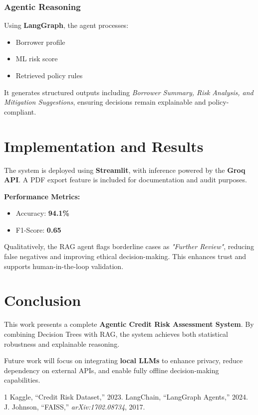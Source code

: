 \documentclass[conference]{IEEEtran}
\begin{document}
\subsubsection{Agentic Reasoning}
Using \textbf{LangGraph}, the agent processes:
\begin{itemize}
\item Borrower profile
\item ML risk score
\item Retrieved policy rules
\end{itemize}

It generates structured outputs including \textit{Borrower Summary, Risk Analysis, and Mitigation Suggestions}, ensuring decisions remain explainable and policy-compliant.

\section{Implementation and Results}
The system is deployed using \textbf{Streamlit}, with inference powered by the \textbf{Groq API}. A PDF export feature is included for documentation and audit purposes.

\textbf{Performance Metrics:}
\begin{itemize}
\item Accuracy: \textbf{94.1\%}
\item F1-Score: \textbf{0.65}
\end{itemize}

Qualitatively, the RAG agent flags borderline cases as \textit{"Further Review"}, reducing false negatives and improving ethical decision-making. This enhances trust and supports human-in-the-loop validation.

\section{Conclusion}
This work presents a complete \textbf{Agentic Credit Risk Assessment System}. By combining Decision Trees with RAG, the system achieves both statistical robustness and explainable reasoning.

Future work will focus on integrating \textbf{local LLMs} to enhance privacy, reduce dependency on external APIs, and enable fully offline decision-making capabilities.

\balance


\begin{thebibliography}{1}
\footnotesize
\bibitem{} Kaggle, ``Credit Risk Dataset,'' 2023.
\bibitem{} LangChain, ``LangGraph Agents,'' 2024.
\bibitem{} J. Johnson, ``FAISS,'' \textit{arXiv:1702.08734}, 2017.
\end{thebibliography}
\end{document}
